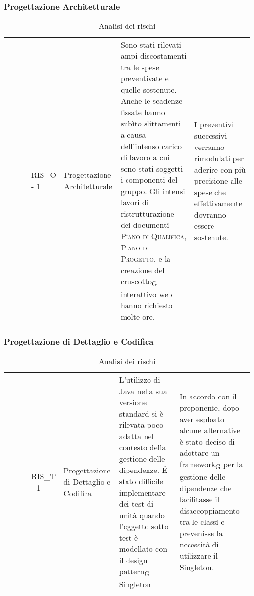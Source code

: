 \subsubsection{Progettazione Architetturale}

\begin{longtable} { 
		>{}M{0.12\textwidth}
		>{\centering}p{0.15\textwidth} 
		>{}p{0.35\textwidth}
		>{}p{0.35\textwidth} 
	}
	\rowcolorhead
	\centering{} &
	\centering{} &
	\centering{} &
	\centering{}
	\endfirsthead	
	\endhead
	\caption{Analisi dei rischi} \endhead	
	RIS\_O - 1 & Progettazione Architetturale & Sono stati rilevati ampi discostamenti tra le spese preventivate e quelle sostenute. Anche le scadenze fissate hanno subìto slittamenti a causa dell'intenso carico di lavoro a cui sono stati soggetti i componenti del gruppo. Gli intensi lavori di ristrutturazione dei documenti \textsc{Piano di Qualifica}, \textsc{Piano di Progetto}, e la creazione del cruscotto\textsubscript{G} interattivo web hanno richiesto molte ore. & I preventivi successivi verranno rimodulati per aderire con più precisione alle spese che effettivamente dovranno essere sostenute.

\end{longtable}


\subsubsection{Progettazione di Dettaglio e Codifica}

\begin{longtable} { 
		>{}M{0.12\textwidth}
		>{\centering}p{0.15\textwidth} 
		>{}p{0.35\textwidth}
		>{}p{0.35\textwidth} 
	}
	\rowcolorhead
	\centering{} &
	\centering{} &
	\centering{} &
	\centering{}
	\endfirsthead	
	\endhead
	\caption{Analisi dei rischi} \endhead
		RIS\_T - 1 & Progettazione di Dettaglio e Codifica & L'utilizzo di Java nella sua versione standard si è rilevata poco adatta nel contesto della gestione delle dipendenze. \'E stato difficile implementare dei test di unità quando l'oggetto sotto test è modellato con il design pattern\textsubscript{G} Singleton & In accordo con il proponente, dopo aver esploato alcune alternative è stato deciso di adottare un framework\textsubscript{G} per la gestione delle dipendenze che facilitasse il disaccoppiamento tra le classi e prevenisse la necessità di utilizzare il Singleton.
\end{longtable}

